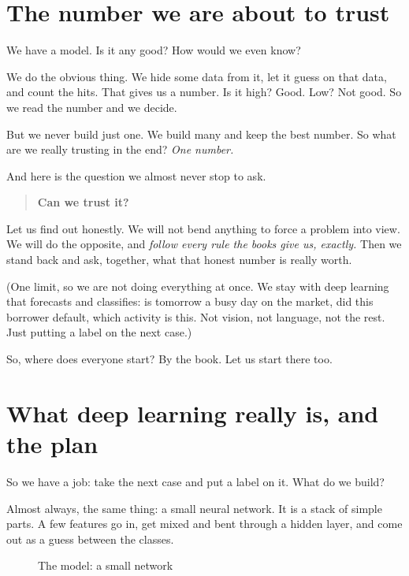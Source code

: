 \documentclass[11pt]{article} %
\begin{document}
\setcounter{section}{-1}

\section{The number we are about to trust}


We have a model. Is it any good? How would we even know?

We do the obvious thing. We hide some data from it, let it guess on that data, and count the hits. That gives us a number. Is it high? Good. Low? Not good. So we read the number and we decide.

But we never build just one. We build many and keep the best number. So what are we really trusting in the end? \emph{One number.}

And here is the question we almost never stop to ask.


\begin{quote}
\textbf{Can we trust it?}
\end{quote}


Let us find out honestly. We will not bend anything to force a problem into view. We will do the opposite, and \emph{follow every rule the books give us, exactly.} Then we stand back and ask, together, what that honest number is really worth.

(One limit, so we are not doing everything at once. We stay with deep learning that forecasts and classifies: is tomorrow a busy day on the market, did this borrower default, which activity is this. Not vision, not language, not the rest. Just putting a label on the next case.)

So, where does everyone start? By the book. Let us start there too.



\section{What deep learning really is, and the plan}


So we have a job: take the next case and put a label on it. What do we build?

Almost always, the same thing: a small neural network. It is a stack of simple parts. A few features go in, get mixed and bent through a hidden layer, and come out as a guess between the classes.

\begin{figure}[htbp]
\centering

\caption{The model: a small network}
\end{figure}
\end{document}
